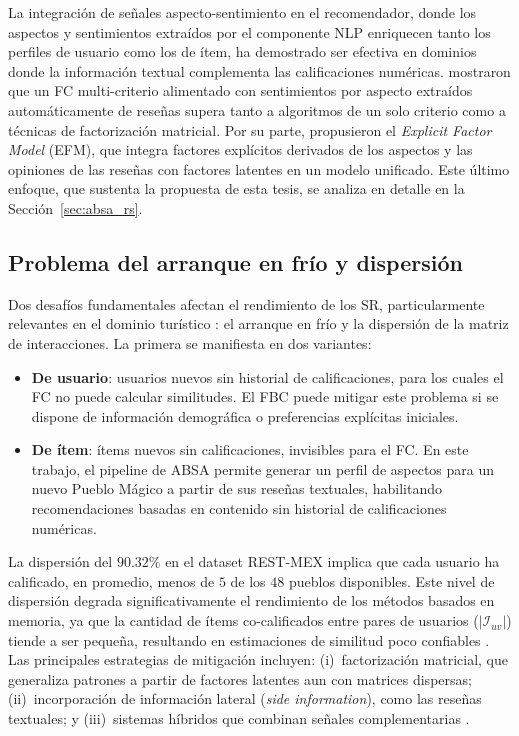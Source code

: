 La integración de señales aspecto-sentimiento en el recomendador, donde los aspectos y sentimientos extraídos por el componente NLP enriquecen tanto los perfiles de usuario como los de ítem, ha demostrado ser efectiva en dominios donde la información textual complementa las calificaciones numéricas. \citet{musto_multi-criteria_2017} mostraron que un FC multi-criterio alimentado con sentimientos por aspecto extraídos automáticamente de reseñas supera tanto a algoritmos de un solo criterio como a técnicas de factorización matricial. Por su parte, \citet{zhang_explicit_2014} propusieron el \textit{Explicit Factor Model} (EFM), que integra factores explícitos derivados de los aspectos y las opiniones de las reseñas con factores latentes en un modelo unificado. Este último enfoque, que sustenta la propuesta de esta tesis, se analiza en detalle en la Sección~\ref{sec:absa_rs}.

\subsection{Problema del arranque en frío y dispersión} \label{subsec:cold_start}

Dos desafíos fundamentales afectan el rendimiento de los SR, particularmente relevantes en el dominio turístico \citep{sarkar_tourism_2023}: el arranque en frío y la dispersión de la matriz de interacciones. La primera se manifiesta en dos variantes:
\begin{itemize}
	\item \textbf{De usuario}: usuarios nuevos sin historial de calificaciones, para los cuales el FC no puede calcular similitudes. El FBC puede mitigar este problema si se dispone de información demográfica o preferencias explícitas iniciales.
	\item \textbf{De ítem}: ítems nuevos sin calificaciones, invisibles para el FC. En este trabajo, el pipeline de ABSA permite generar un perfil de aspectos para un nuevo Pueblo Mágico a partir de sus reseñas textuales, habilitando recomendaciones basadas en contenido sin historial de calificaciones numéricas.
\end{itemize}

La dispersión del $90.32\%$ en el dataset REST-MEX implica que cada usuario ha calificado, en promedio, menos de $5$ de los $48$ pueblos disponibles. Este nivel de dispersión degrada significativamente el rendimiento de los métodos basados en memoria, ya que la cantidad de ítems co-calificados entre pares de usuarios ($|\mathcal{I}_{uv}|$) tiende a ser pequeña, resultando en estimaciones de similitud poco confiables \citep{raza_comprehensive_2025}. Las principales estrategias de mitigación incluyen: (i)~factorización matricial, que generaliza patrones a partir de factores latentes aun con matrices dispersas; (ii)~incorporación de información lateral (\textit{side information}), como las reseñas textuales; y (iii)~sistemas híbridos que combinan señales complementarias \citep{payandenick_multi-criteria_2025}.

